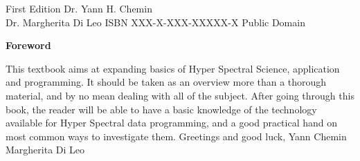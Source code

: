 \documentclass[10pt]{book}
\begin{document}
First Edition\newline\linebreak
Dr. Yann H. Chemin\\Dr. Margherita Di Leo\newline\linebreak
ISBN  XXX-X-XXX-XXXXX-X\newline\linebreak
Public Domain\newline
\newpage
\begin{center}
 \textbf{Foreword}
\end{center}
This textbook aims at expanding basics of Hyper Spectral Science, application and programming.
It should be taken as an overview more than a thorough material, and by no mean dealing with all of the subject. 
\newline\linebreak
After going through this book, the reader will be able to have a basic knowledge of the technology available
for Hyper Spectral data programming, and a good practical hand on most common ways to investigate them.
\newline\linebreak
Greetings and good luck,\newline
Yann Chemin\\Margherita Di Leo\newline\linebreak

\tableofcontents

\newpage

\end{document}
